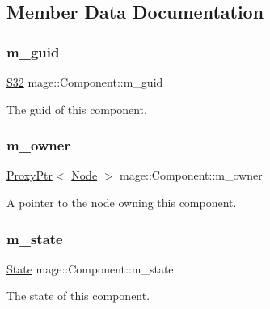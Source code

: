 \subsection{Member Data Documentation}
\hypertarget{classmage_1_1_component_ab91d982f032cda187dfd3b4bb6b3d3a6}{}\label{classmage_1_1_component_ab91d982f032cda187dfd3b4bb6b3d3a6} 
\subsubsection{\texorpdfstring{m\+\_\+guid}{m\_guid}}
{\footnotesize\ttfamily \hyperlink{namespacemage_a642e05c5c83642b6946703615cdbf2da}{S32} mage\+::\+Component\+::m\+\_\+guid\hspace{0.3cm}{\ttfamily [private]}}

The guid of this component. \hypertarget{classmage_1_1_component_ad32770e1f30112cebd2894c1e976a4a7}{}\label{classmage_1_1_component_ad32770e1f30112cebd2894c1e976a4a7} 
\subsubsection{\texorpdfstring{m\+\_\+owner}{m\_owner}}
{\footnotesize\ttfamily \hyperlink{classmage_1_1_proxy_ptr}{Proxy\+Ptr}$<$ \hyperlink{classmage_1_1_node}{Node} $>$ mage\+::\+Component\+::m\+\_\+owner\hspace{0.3cm}{\ttfamily [private]}}

A pointer to the node owning this component. \hypertarget{classmage_1_1_component_a541a035d18f4d9f3873996716a8192d5}{}\label{classmage_1_1_component_a541a035d18f4d9f3873996716a8192d5} 
\subsubsection{\texorpdfstring{m\+\_\+state}{m\_state}}
{\footnotesize\ttfamily \hyperlink{namespacemage_a8159a53ed2ac3a0fe7058b2a051fa969}{State} mage\+::\+Component\+::m\+\_\+state\hspace{0.3cm}{\ttfamily [private]}}

The state of this component. 